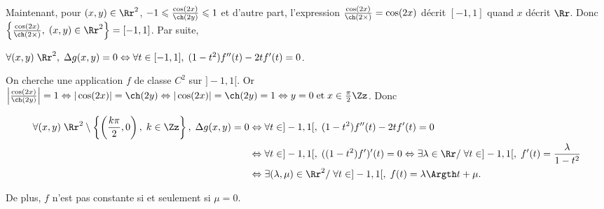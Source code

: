 {{Maintenant, pour $(x,y)\in\Rr^2$, $-1\leqslant  \frac{\cos(2x)}{\ch(2y)}\leqslant1$ et d'autre part, l'expression  $ \frac{\cos(2x)}{\ch(2\times)}=\cos(2x)$ décrit $[-1,1]$ quand $x$ décrit $\Rr$. Donc $\left\{ \frac{\cos(2x)}{\ch(2\times)},\;(x,y)\in\Rr^2\right\}=[-1,1]$. Par suite,

\begin{center}
$\forall(x,y)\;\Rr^2,\;\Delta g(x,y)=0\Leftrightarrow\forall t\in[-1,1],\;(1-t^2)f''(t)-2tf'(t)=0$.
\end{center}

On cherche une application $f$ de classe $C^2$ sur $]-1,1[$. Or $\left| \frac{\cos(2x)}{\ch(2y)}\right|=1\Leftrightarrow|\cos(2x)|=\ch(2y)\Leftrightarrow|\cos(2x)|=\ch(2y)=1\Leftrightarrow y=0\;\text{et}\;x\in \frac{\pi}{2}\Zz$. Donc

\begin{align*}\ensuremath
\forall(x,y)\;\Rr^2\setminus\left\{\left( \frac{k\pi}{2},0\right),\;k\in\Zz\right\},\;\Delta g(x,y)=0&\Leftrightarrow\forall t\in]-1,1[,\;(1-t^2)f''(t)-2tf'(t)=0\\
 &\Leftrightarrow\forall t\in]-1,1[,\;((1-t^2)f')'(t)=0\Leftrightarrow\exists\lambda\in\Rr/\;\forall t\in]-1,1[,\;f'(t)= \frac{\lambda}{1-t^2}\\
 &\Leftrightarrow\exists(\lambda,\mu)\in\Rr^2/\;\forall t\in]-1,1[,\;f(t)=\lambda\Argth t+\mu.
\end{align*}

De plus, $f$ n'est pas constante si et seulement si $\mu=0$.

\begin{center}
\end{center}}
}